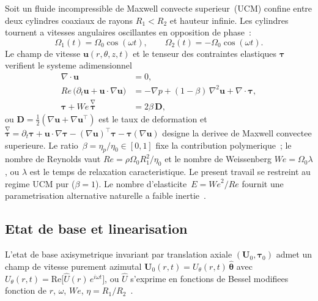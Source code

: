 \documentclass[11pt,a4paper]{article}
\newcommand{\We}{\mathit{We}}
\newcommand{\Rey}{\mathit{Re}}
\begin{document}
Soit un fluide incompressible de Maxwell convecte superieur~(UCM)
confine entre deux cylindres coaxiaux de rayons $R_1\!<\!R_2$ et
hauteur infinie. Les cylindres tournent a vitesses angulaires
oscillantes en opposition de phase~:
\begin{equation}
\Omega_1(t)=\Omega_0\cos(\omega t),\qquad
\Omega_2(t)=-\Omega_0\cos(\omega t).
\end{equation}
Le champ de vitesse $\mathbf{u}(r,\theta,z,t)$ et le tenseur des
contraintes elastiques $\bm\tau$ verifient le systeme
adimensionnel
\begin{align}
\nabla\cdot\mathbf{u} &= 0,\label{eq:incomp}\\
\Rey\,\bigl(\partial_t\mathbf{u}+\mathbf{u}\!\cdot\!\nabla\mathbf{u}\bigr)
   &= -\nabla p + (1-\beta)\,\nabla^2\mathbf{u}
       + \nabla\cdot\bm\tau,\label{eq:momentum}\\
\bm\tau + \We\,\stackrel{\nabla}{\bm\tau}
   &= 2\beta\,\mathbf{D},\label{eq:UCM}
\end{align}
ou
$\mathbf{D}=\tfrac{1}{2}(\nabla\mathbf{u}+\nabla\mathbf{u}^\top)$
est le taux de deformation et
$\stackrel{\nabla}{\bm\tau}
=\partial_t\bm\tau+\mathbf{u}\!\cdot\!\nabla\bm\tau
-(\nabla\mathbf{u})^\top\bm\tau-\bm\tau(\nabla\mathbf{u})$
designe la derivee de Maxwell convectee superieure. Le
ratio~$\beta=\eta_p/\eta_0\in[0,1]$ fixe la contribution
polymerique~; le nombre de Reynolds vaut
$\Rey=\rho\Omega_0 R_1^2/\eta_0$ et le nombre de Weissenberg
$\We=\Omega_0\lambda$, ou $\lambda$ est le temps de relaxation
caracteristique. Le present travail se restreint au regime UCM
pur ($\beta\!=\!1$). Le nombre d'elasticite~$E=\We^2/\Rey$
fournit une parametrisation alternative naturelle a faible
inertie~\cite{larson1990}.

\subsection{Etat de base et linearisation}

L'etat de base axisymetrique invariant par translation axiale
$(\mathbf{U}_0,\bm\tau_0)$ admet un champ de vitesse purement
azimutal $\mathbf{U}_0(r,t)=U_\theta(r,t)\,\hat{\bm\theta}$ avec
$U_\theta(r,t)=\mathrm{Re}\!\bigl[\hat U(r)\,e^{i\omega t}\bigr]$,
ou $\hat U$ s'exprime en fonctions de Bessel modifiees fonction
de $r$, $\omega$, $\We$, $\eta\!=\!R_1/R_2$~\cite{hayani2021}.
\end{document}
